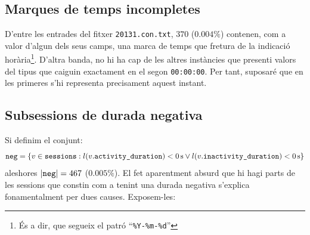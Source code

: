 \documentclass[
	a4paper,
	twoside,
	justified
]{tufte-book}
\begin{document}
\subsection{Marques de temps incompletes}

D'entre les entrades del fitxer \texttt{20131.con.txt}, $370$ ($0.004 \%$) contenen, com a valor d'algun dels seus camps, una marca de temps que fretura de la indicació horària\footnote{És a dir, que segueix el patró ``\texttt{\%Y-\%m-\%d}''}. D'altra banda, no hi ha cap de les altres instàncies que presenti valors del tipus  que caiguin exactament en el segon \texttt{00:00:00}. Per tant, suposaré que en les primeres s'hi representa precisament aquest instant.

\subsection{Subsessions de durada negativa}

Si definim el conjunt: 
$$
 \texttt{neg} =  \{v \in \texttt{sessions} : l(v.\texttt{activity\_duration}) < \SI{0}{s} \vee 
    l(v.\texttt{inactivity\_duration}) < \SI{0}{s} \}
$$  
aleshores $|\texttt{neg}| = 467$ ($0.005\%$). El fet aparentment absurd que hi hagi parts de les sessions que constin com a tenint una durada negativa s'explica fonamentalment per dues causes. Exposem-les: 
\end{document}
